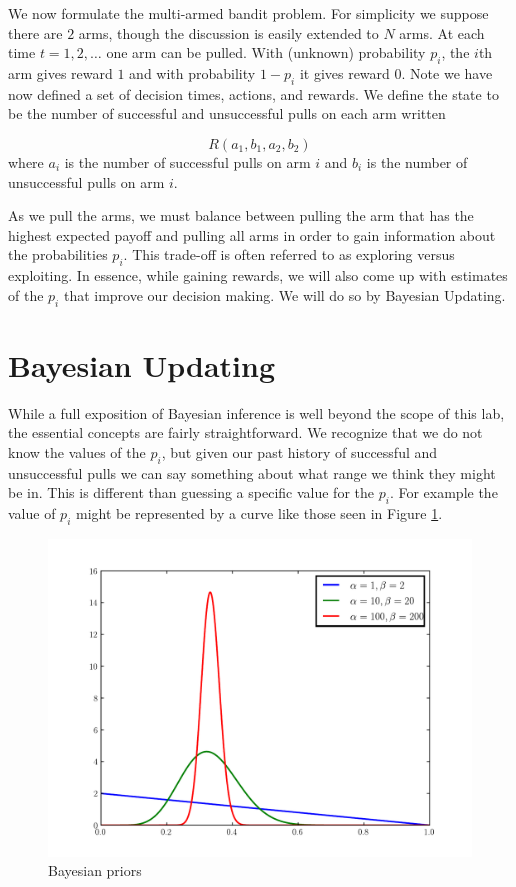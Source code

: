 We now formulate the multi-armed bandit problem.  For simplicity we suppose there are $2$ arms, though the discussion is easily extended to $N$ arms.  At each time $t= 1,2,\ldots$ one arm can be pulled.  With (unknown) probability $p_i$, the $i$th arm gives reward $1$ and with probability $1-p_i$ it gives reward $0$.  Note we have now defined a set of decision times, actions, and rewards.  We define the state to be the number of successful and unsuccessful pulls on each arm written

\begin{equation}\label{state}
R(a_1,b_1,a_2,b_2)
\end{equation}
\noindent
where $a_i$ is the number of successful pulls on arm $i$ and $b_i$ is the number of unsuccessful pulls on arm $i$.

As we pull the arms, we must balance between pulling the arm that has the highest expected payoff and pulling all arms in order to gain information about the probabilities $p_i$.  This trade-off is often referred to as exploring versus exploiting.  In essence, while gaining rewards, we will also come up with estimates of the $p_i$ that improve our decision making.  We will do so by Bayesian Updating.

\section*{Bayesian Updating}
While a full exposition of Bayesian inference is well beyond the scope of this lab, the essential concepts are fairly straightforward.  We recognize that we do not know the values of the $p_i$, but given our past history of successful and unsuccessful pulls we can say something about what range we think they might be in. This is different than guessing a specific value for the $p_i$.  For example the value of $p_i$ might be represented by a curve like those seen in Figure \ref{fig:priors}.

\begin{figure}
\begin{center}
        \includegraphics[width=\textwidth]{./Algorithms/MarkDecProc/priors.pdf}
        \caption{Bayesian priors}
				\label{fig:priors}
\end{center}
\end{figure}

